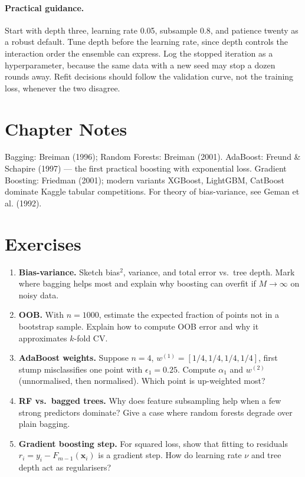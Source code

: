 \paragraph{Practical guidance.} Start with depth three, learning rate 0.05, subsample 0.8, and patience twenty as a robust default.
Tune depth before the learning rate, since depth controls the interaction order the ensemble can express.
Log the stopped iteration as a hyperparameter, because the same data with a new seed may stop a dozen rounds away.
Refit decisions should follow the validation curve, not the training loss, whenever the two disagree.

\section{Chapter Notes}
Bagging: Breiman (1996); Random Forests: Breiman (2001). AdaBoost: Freund \& Schapire (1997) --- the first practical boosting with exponential loss. Gradient Boosting: Friedman (2001); modern variants XGBoost, LightGBM, CatBoost dominate Kaggle tabular competitions. For theory of bias-variance, see Geman et al. (1992).

\section{Exercises}
\begin{enumerate}[label=E4.\arabic*, leftmargin=*, itemsep=0.6em]
    \item \textbf{Bias-variance.} Sketch bias$^2$, variance, and total error vs.\ tree depth. Mark where bagging helps most and explain why boosting can overfit if $M\to\infty$ on noisy data.
    \item \textbf{OOB.} With $n=1000$, estimate the expected fraction of points not in a bootstrap sample. Explain how to compute OOB error and why it approximates $k$-fold CV.
    \item \textbf{AdaBoost weights.} Suppose $n=4$, $w^{(1)}=[1/4,1/4,1/4,1/4]$, first stump misclassifies one point with $\epsilon_1=0.25$. Compute $\alpha_1$ and $w^{(2)}$ (unnormalised, then normalised). Which point is up-weighted most?
    \item \textbf{RF vs.\ bagged trees.} Why does feature subsampling help when a few strong predictors dominate? Give a case where random forests degrade over plain bagging.
    \item \textbf{Gradient boosting step.} For squared loss, show that fitting to residuals $r_i=y_i-F_{m-1}(\mathbf{x}_i)$ is a gradient step. How do learning rate $\nu$ and tree depth act as regularisers?
\end{enumerate}
